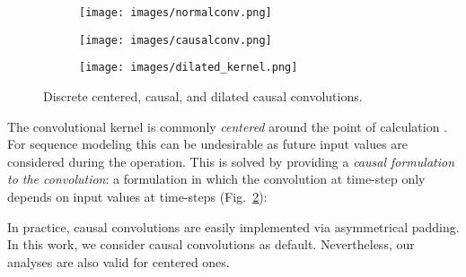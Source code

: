 \documentclass{article}
\begin{document}
\begin{figure}[t]
     \centering
     \begin{subfigure}[b]{0.26\textwidth}
         \centering
         \texttt{[image: images/normalconv.png]}
         \caption{}
         \label{fig:centered_conv}
     \end{subfigure}
     \hfill
     \begin{subfigure}[b]{0.26\textwidth}
         \centering
         \texttt{[image: images/causalconv.png]}
         \caption{}
         \label{fig:causal_conv}
     \end{subfigure}
     \hfill
     \begin{subfigure}[b]{0.35\textwidth}
         \centering
         \texttt{[image: images/dilated\_kernel.png]}
         \caption{}
         \label{fig:dilated_conv}
     \end{subfigure}
     \vspace{-2mm}
     \caption{Discrete centered, causal, and dilated causal convolutions.
     \vspace{-3.5mm}}
        \label{fig:causal_vs_centered}
\end{figure}
The convolutional kernel is commonly \textit{centered} around the point of calculation . For sequence modeling this can be undesirable as future input values  are considered during the operation. This is solved by providing a \textit{causal formulation to the convolution}: a formulation in which the convolution at time-step  only depends on input values at time-steps  (Fig.~\ref{fig:causal_conv}):

In practice, causal convolutions are easily implemented via asymmetrical padding. In this work, we consider causal convolutions as default. Nevertheless, our analyses are also valid for centered ones.
\end{document}
